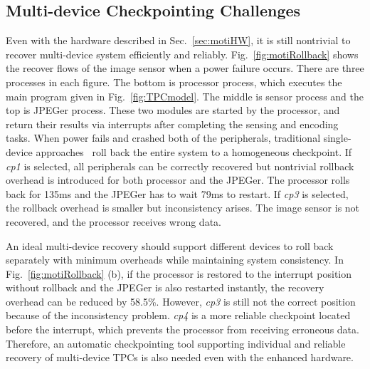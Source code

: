 \subsection{Multi-device Checkpointing Challenges} \label{sec:motiSW}
%
Even with the hardware described in Sec.~\ref{sec:motiHW}, it is still nontrivial to recover multi-device system efficiently and reliably. 
Fig.~\ref{fig:motiRollback} shows the recover flows of the image sensor when a power failure occurs.
There are three processes in each figure.
The bottom is processor process, which executes the main program given in Fig.~\ref{fig:TPCmodel}.
The middle is sensor process and the top is JPEGer process. 
These two modules are started by the processor, and return their results via interrupts after completing the sensing and encoding tasks.
When power fails and crashed both of the peripherals, traditional single-device approaches~\cite{ransford2012mementos, balsamo2015hibernus, jayakumar2014quickrecall} roll back the entire system to a homogeneous checkpoint.
If \emph{cp1} is selected, all peripherals can be correctly recovered but nontrivial rollback overhead is introduced for both processor and the JPEGer. 
The processor rolls back for 135ms and the JPEGer has to wait 79ms to restart.
If \emph{cp3} is selected, the rollback overhead is smaller but inconsistency arises. 
The image sensor is not recovered, and the processor receives wrong data.

An ideal multi-device recovery should support different devices to roll back separately with minimum overheads while maintaining system consistency. 
In Fig.~\ref{fig:motiRollback} (b), if the processor is restored to the interrupt position without rollback and the JPEGer is also restarted instantly, the recovery overhead can be reduced by 58.5\%.
However,  \emph{cp3} is still not the correct position because of the inconsistency problem. \emph{cp4} is a more reliable checkpoint located before the interrupt, which prevents the processor from receiving erroneous data.
Therefore, an automatic checkpointing tool supporting individual and reliable recovery of multi-device  TPCs is also needed even with the enhanced hardware. 










